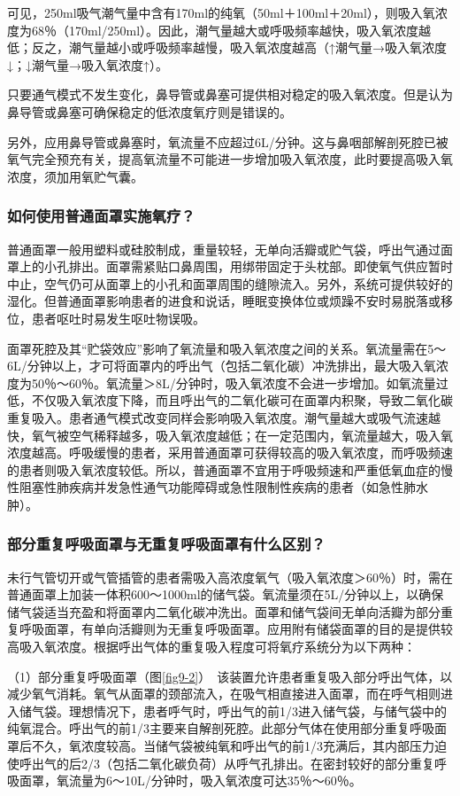可见，250ml吸气潮气量中含有170ml的纯氧（50ml＋100ml＋20ml），则吸入氧浓度为68％（170ml/250ml）。因此，潮气量越大或呼吸频率越快，吸入氧浓度越低；反之，潮气量越小或呼吸频率越慢，吸入氧浓度越高（↑潮气量→吸入氧浓度↓；↓潮气量→吸入氧浓度↑）。

只要通气模式不发生变化，鼻导管或鼻塞可提供相对稳定的吸入氧浓度。但是认为鼻导管或鼻塞可确保稳定的低浓度氧疗则是错误的。

另外，应用鼻导管或鼻塞时，氧流量不应超过6L/分钟。这与鼻咽部解剖死腔已被氧气完全预充有关，提高氧流量不可能进一步增加吸入氧浓度，此时要提高吸入氧浓度，须加用氧贮气囊。

\subsubsection{如何使用普通面罩实施氧疗？}

普通面罩一般用塑料或硅胶制成，重量较轻，无单向活瓣或贮气袋，呼出气通过面罩上的小孔排出。面罩需紧贴口鼻周围，用绑带固定于头枕部。即使氧气供应暂时中止，空气仍可从面罩上的小孔和面罩周围的缝隙流入。另外，系统可提供较好的湿化。但普通面罩影响患者的进食和说话，睡眠变换体位或烦躁不安时易脱落或移位，患者呕吐时易发生呕吐物误吸。

面罩死腔及其“贮袋效应”影响了氧流量和吸入氧浓度之间的关系。氧流量需在5～6L/分钟以上，才可将面罩内的呼出气（包括二氧化碳）冲洗排出，最大吸入氧浓度为50％～60％。氧流量＞8L/分钟时，吸入氧浓度不会进一步增加。如氧流量过低，不仅吸入氧浓度下降，而且呼出气的二氧化碳可在面罩内积聚，导致二氧化碳重复吸入。患者通气模式改变同样会影响吸入氧浓度。潮气量越大或吸气流速越快，氧气被空气稀释越多，吸入氧浓度越低；在一定范围内，氧流量越大，吸入氧浓度越高。呼吸缓慢的患者，采用普通面罩可获得较高的吸入氧浓度，而呼吸频速的患者则吸入氧浓度较低。所以，普通面罩不宜用于呼吸频速和严重低氧血症的慢性阻塞性肺疾病并发急性通气功能障碍或急性限制性疾病的患者（如急性肺水肿）。

\subsubsection{部分重复呼吸面罩与无重复呼吸面罩有什么区别？}

未行气管切开或气管插管的患者需吸入高浓度氧气（吸入氧浓度＞60％）时，需在普通面罩上加装一体积600～1000ml的储气袋。氧流量须在5L/分钟以上，以确保储气袋适当充盈和将面罩内二氧化碳冲洗出。面罩和储气袋间无单向活瓣为部分重复呼吸面罩，有单向活瓣则为无重复呼吸面罩。应用附有储袋面罩的目的是提供较高吸入氧浓度。根据呼出气体的重复吸入程度可将氧疗系统分为以下两种：

（1）部分重复呼吸面罩（图\ref{fig9-2}）　该装置允许患者重复吸入部分呼出气体，以减少氧气消耗。氧气从面罩的颈部流入，在吸气相直接进入面罩，而在呼气相则进入储气袋。理想情况下，患者呼气时，呼出气的前1/3进入储气袋，与储气袋中的纯氧混合。呼出气的前1/3主要来自解剖死腔。此部分气体在使用部分重复呼吸面罩后不久，氧浓度较高。当储气袋被纯氧和呼出气的前1/3充满后，其内部压力迫使呼出气的后2/3（包括二氧化碳负荷）从呼气孔排出。在密封较好的部分重复呼吸面罩，氧流量为6～10L/分钟时，吸入氧浓度可达35％～60％。

